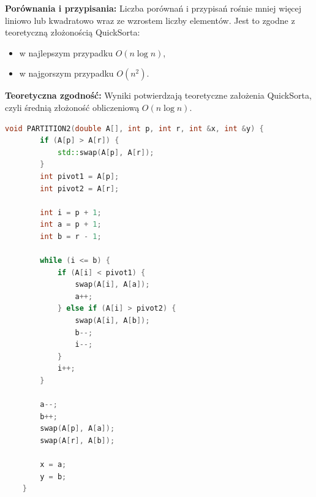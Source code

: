 \documentclass{article}
\begin{document}
	\textbf{Porównania i przypisania:} Liczba porównań i przypisań rośnie mniej więcej liniowo lub kwadratowo wraz ze wzrostem liczby elementów. Jest to zgodne z teoretyczną złożonością QuickSorta:
	\begin{itemize}
		\item w najlepszym przypadku \(O(n \log n)\),
		\item w najgorszym przypadku \(O(n^2)\).
	\end{itemize}
	\textbf{Teoretyczna zgodność:} Wyniki potwierdzają teoretyczne założenia QuickSorta, czyli średnią złożoność obliczeniową \(O(n \log n)\).
	
	
	\begin{lstlisting}[language=C++, tabsize=3]
	void PARTITION2(double A[], int p, int r, int &x, int &y) {
		if (A[p] > A[r]) {
			std::swap(A[p], A[r]);
		}
		int pivot1 = A[p];
		int pivot2 = A[r];
		
		int i = p + 1;
		int a = p + 1; 
		int b = r - 1; 
		
		while (i <= b) {
			if (A[i] < pivot1) {
				swap(A[i], A[a]);
				a++;
			} else if (A[i] > pivot2) {
				swap(A[i], A[b]);
				b--;
				i--; 
			}
			i++;
		}
		
		a--;
		b++;
		swap(A[p], A[a]);
		swap(A[r], A[b]);
		
		x = a;
		y = b;
	}
	\end{lstlisting}
	
\end{document}
